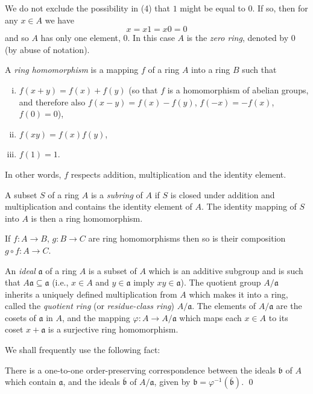 \begin{remark}
We do not exclude the possibility in (4) that $1$ might be equal to $0$. If so, then for any $x \in A$ we have
\[
    x = x1 = x0 = 0
\]
and so $A$ has only one element, $0$. In this case $A$ is the \emph{zero ring}, denoted by $0$ (by abuse of notation).
\end{remark}

A \emph{ring homomorphism} is a mapping $f$ of a ring $A$ into a ring $B$ such that
\begin{enumerate}[i)]
    \item $f(x + y) = f(x) + f(y)$ (so that $f$ is a homomorphism of abelian groups, and therefore also $f(x - y) = f(x) - f(y)$, $f(-x) = -f(x)$, $f(0) = 0$),
    \item $f(xy) = f(x)f(y)$,
    \item $f(1) = 1$.
\end{enumerate}

In other words, $f$ respects addition, multiplication and the identity element.

A subset $S$ of a ring $A$ is a \emph{subring} of $A$ if $S$ is closed under addition and multiplication and contains the identity element of $A$. The identity mapping of $S$ into $A$ is then a ring homomorphism.

If $f \colon A \to B$, $g \colon B \to C$ are ring homomorphisms then so is their composition $g \circ f \colon A \to C$.



An \emph{ideal} $\mathfrak{a}$ of a ring $A$ is a subset of $A$ which is an additive subgroup and is such that $A\mathfrak{a} \subseteq \mathfrak{a}$ (i.e., $x \in A$ and $y \in \mathfrak{a}$ imply $xy \in \mathfrak{a}$). The quotient group $A/\mathfrak{a}$ inherits a uniquely defined multiplication from $A$ which makes it into a ring, called the \emph{quotient ring} (or \emph{residue-class ring}) $A/\mathfrak{a}$. The elements of $A/\mathfrak{a}$ are the cosets of $\mathfrak{a}$ in $A$, and the mapping $\varphi \colon A \to A/\mathfrak{a}$ which maps each $x \in A$ to its coset $x + \mathfrak{a}$ is a surjective ring homomorphism.

We shall frequently use the following fact:

\begin{proposition}\label{prop:ideal-correspondence}
There is a one-to-one order-preserving correspondence between the ideals $\mathfrak{b}$ of $A$ which contain $\mathfrak{a}$, and the ideals $\bar{\mathfrak{b}}$ of $A/\mathfrak{a}$, given by $\mathfrak{b} = \varphi^{-1}(\bar{\mathfrak{b}})$. \qed
\end{proposition}

